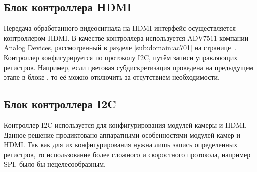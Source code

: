 
\subsection{Блок контроллера HDMI}
\label{sec:structural:hdmi_controller}
Передача обработанного видеосигнала на HDMI интерфейс осуществляется контроллером HDMI.
В качестве контроллера используется ADV7511 компании Analog Devices, рассмотренный в разделе
\ref{sub:domain:ac701} на странице~\pageref{fig:domain:ac701:hdmi}. Контроллер конфигурируется
по протоколу I2C, путём записи управляющих регистров. Например, если цветовая субдискретизация
проведена на предыдущем этапе в блоке , то её можно отключить за отсутствием необходимости.

\subsection{Блок контроллера I2C}
\label{sec:structural:i2c}
Контроллер I2C используется для конфигурирования модулей камеры и HDMI. Данное решение продиктовано
аппаратными особенностями модулей камер и HDMI. Так как для их конфигурирования нужна лишь запись определенных регистров,
то использование более сложного и скоростного протокола, например SPI, было бы нецелесообразным.
